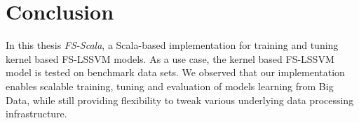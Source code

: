 \chapter{Conclusion}
\label{cha:conclusion}
In this thesis \textit{FS-Scala}, a Scala-based implementation for training and tuning kernel based FS-LSSVM models. As a use case, the kernel based FS-LSSVM model is tested on benchmark data sets. We observed that our implementation enables scalable training, tuning and evaluation of models learning from Big Data, while still providing flexibility to tweak various underlying data processing infrastructure.



